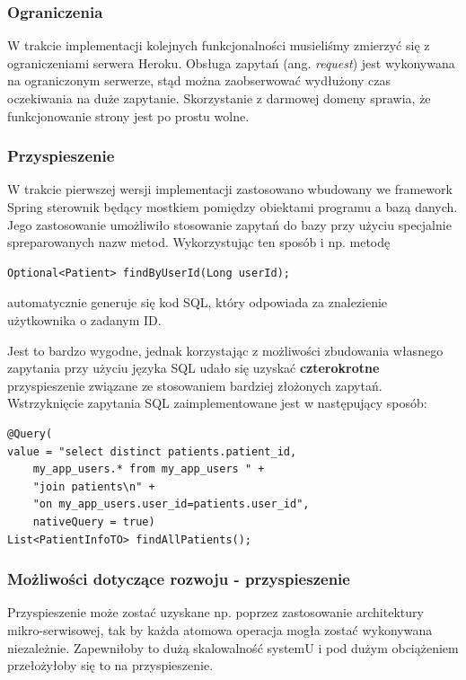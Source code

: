 \subsubsection{Ograniczenia}
W trakcie implementacji kolejnych funkcjonalności musieliśmy zmierzyć się z ograniczeniami serwera Heroku. Obsługa zapytań (ang. \textit{request}) jest wykonywana na ograniczonym serwerze, stąd można zaobserwować wydłużony czas oczekiwania na duże zapytanie. Skorzystanie z darmowej domeny sprawia, że funkcjonowanie strony jest po prostu wolne.

\subsubsection{Przyspieszenie}
W trakcie pierwszej wersji implementacji zastosowano wbudowany we framework Spring sterownik będący mostkiem pomiędzy obiektami programu a bazą danych. Jego zastosowanie umożliwiło stosowanie zapytań do bazy przy użyciu specjalnie spreparowanych nazw metod. Wykorzystując ten sposób i np. metodę

\begin{lstlisting}
Optional<Patient> findByUserId(Long userId);
\end{lstlisting}

automatycznie generuje się kod SQL, który odpowiada za znalezienie użytkownika o zadanym ID.

Jest to bardzo wygodne, jednak korzystając z możliwości zbudowania własnego zapytania przy użyciu języka SQL udało się uzyskać \textbf{czterokrotne} przyspieszenie związane ze stosowaniem bardziej złożonych zapytań. Wstrzyknięcie zapytania SQL zaimplementowane jest w następujący sposób:

\begin{lstlisting}
@Query(
value = "select distinct patients.patient_id, 
	my_app_users.* from my_app_users " +
	"join patients\n" +
	"on my_app_users.user_id=patients.user_id",
	nativeQuery = true)
List<PatientInfoTO> findAllPatients();
\end{lstlisting}



\subsubsection{Możliwości dotyczące rozwoju - przyspieszenie}
Przyspieszenie może zostać uzyskane np. poprzez zastosowanie architektury mikro-serwisowej, tak by każda atomowa operacja mogła zostać wykonywana niezależnie. Zapewniłoby to dużą skalowalność systemU i pod dużym obciążeniem przełożyłoby się to na przyspieszenie. 

